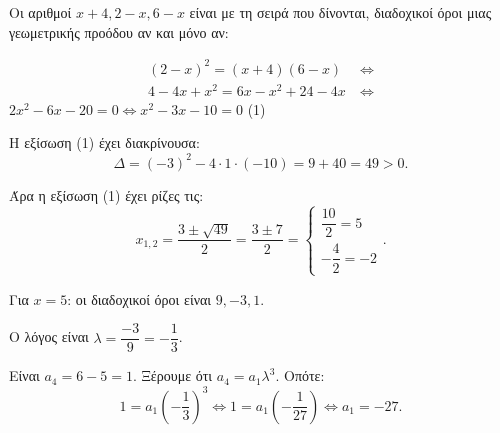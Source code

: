 
\begin{alist}
\item Οι αριθμοί $x + 4, 2 - x, 6 - x$ είναι με τη σειρά που δίνονται, διαδοχικοί όροι μιας
γεωμετρικής προόδου αν και μόνο αν:

\begin{align*}
(2 - x)^2 = (x + 4)(6 - x) \ &\Leftrightarrow \\
4 - 4x + x^2 = 6x - x^2 + 24 - 4x \ &\Leftrightarrow
\end{align*}
$2x^2 - 6x - 20 = 0 \Leftrightarrow x^2 - 3x - 10 = 0$ (1)

Η εξίσωση (1) έχει διακρίνουσα:
\[\Delta = (-3)^2 - 4 \cdot 1 \cdot (-10) = 9 + 40 = 49 > 0.\]

Άρα η εξίσωση (1) έχει ρίζες τις:
\[x_{1,2} = \dfrac{3 \pm \sqrt{49}}{2} = \dfrac{3 \pm 7}{2} = \begin{cases} \dfrac{10}{2} = 5 \\ -\dfrac{4}{2} = -2 \end{cases}.\]

\item Για $x = 5$: οι διαδοχικοί όροι είναι $9, -3, 1$.

\begin{rlist}
\item Ο λόγος είναι $\lambda = \dfrac{-3}{9} = -\dfrac{1}{3}$.

\item Είναι $a_4 = 6 - 5 = 1$. Ξέρουμε ότι $a_4 = a_1 \lambda^3$.
Οπότε:
\[1 = a_1 \left(-\dfrac{1}{3}\right)^3 \Leftrightarrow 1 = a_1 \left(-\dfrac{1}{27}\right) \Leftrightarrow a_1 = -27.\]
\end{rlist}
\end{alist}

